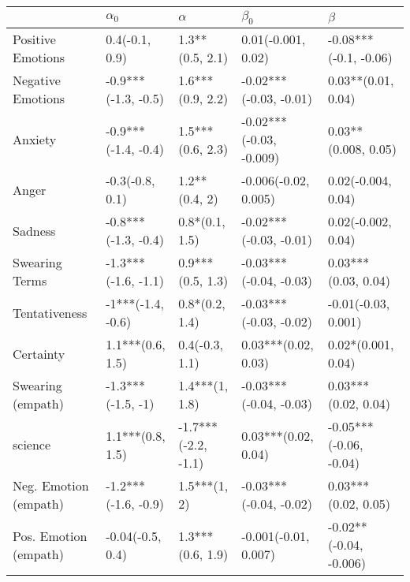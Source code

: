 \begin{tabular}{lllll}
\toprule
{} &           $\alpha_0$ &             $\alpha$ &                $\beta_0$ &                 $\beta$ \\
\midrule
Positive Emotions     &       0.4(-0.1, 0.9) &      1.3**(0.5, 2.1) &       0.01(-0.001, 0.02) &   -0.08***(-0.1, -0.06) \\
Negative Emotions     &  -0.9***(-1.3, -0.5) &     1.6***(0.9, 2.2) &   -0.02***(-0.03, -0.01) &      0.03**(0.01, 0.04) \\
Anxiety               &  -0.9***(-1.4, -0.4) &     1.5***(0.6, 2.3) &  -0.02***(-0.03, -0.009) &     0.03**(0.008, 0.05) \\
Anger                 &      -0.3(-0.8, 0.1) &        1.2**(0.4, 2) &     -0.006(-0.02, 0.005) &      0.02(-0.004, 0.04) \\
Sadness               &  -0.8***(-1.3, -0.4) &       0.8*(0.1, 1.5) &   -0.02***(-0.03, -0.01) &      0.02(-0.002, 0.04) \\
Swearing Terms        &  -1.3***(-1.6, -1.1) &     0.9***(0.5, 1.3) &   -0.03***(-0.04, -0.03) &     0.03***(0.03, 0.04) \\
Tentativeness         &    -1***(-1.4, -0.6) &       0.8*(0.2, 1.4) &   -0.03***(-0.03, -0.02) &     -0.01(-0.03, 0.001) \\
Certainty             &     1.1***(0.6, 1.5) &       0.4(-0.3, 1.1) &      0.03***(0.02, 0.03) &      0.02*(0.001, 0.04) \\
Swearing (empath)     &    -1.3***(-1.5, -1) &       1.4***(1, 1.8) &   -0.03***(-0.04, -0.03) &     0.03***(0.02, 0.04) \\
science               &     1.1***(0.8, 1.5) &  -1.7***(-2.2, -1.1) &      0.03***(0.02, 0.04) &  -0.05***(-0.06, -0.04) \\
Neg. Emotion (empath) &  -1.2***(-1.6, -0.9) &         1.5***(1, 2) &   -0.03***(-0.04, -0.02) &     0.03***(0.02, 0.05) \\
Pos. Emotion (empath) &     -0.04(-0.5, 0.4) &     1.3***(0.6, 1.9) &     -0.001(-0.01, 0.007) &  -0.02**(-0.04, -0.006) \\
\bottomrule
\end{tabular}
